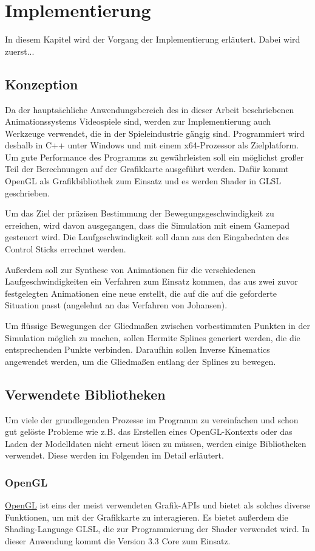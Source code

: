 \chapter{Implementierung}
In diesem Kapitel wird der Vorgang der Implementierung erläutert. Dabei wird zuerst...


\section{Konzeption}
Da der hauptsächliche Anwendungsbereich des in dieser Arbeit beschriebenen Animationssystems Videospiele sind, werden zur Implementierung auch Werkzeuge verwendet, die in der Spieleindustrie gängig sind. Programmiert wird deshalb in C++ unter Windows und mit einem x64-Prozessor als Zielplatform. Um gute Performance des Programms zu gewährleisten soll ein möglichst großer Teil der Berechnungen auf der Grafikkarte ausgeführt werden. Dafür kommt OpenGL als Grafikbibliothek zum Einsatz und es werden Shader in GLSL geschrieben.

Um das Ziel der präzisen Bestimmung der Bewegungsgeschwindigkeit zu erreichen, wird davon ausgegangen, dass die Simulation mit einem Gamepad gesteuert wird. Die Laufgeschwindigkeit soll dann aus den Eingabedaten des Control Sticks errechnet werden.

Außerdem soll zur Synthese von Animationen für die verschiedenen Laufgeschwindigkeiten ein Verfahren zum Einsatz kommen, das aus zwei zuvor festgelegten Animationen eine neue erstellt, die auf die auf die geforderte Situation passt (angelehnt an das Verfahren von Johansen\cite{johansen2009automated}).

Um flüssige Bewegungen der Gliedmaßen zwischen vorbestimmten Punkten in der Simulation möglich zu machen, sollen Hermite Splines generiert werden, die die entsprechenden Punkte verbinden. Daraufhin sollen Inverse Kinematics angewendet werden, um die Gliedmaßen entlang der Splines zu bewegen.

\section{Verwendete Bibliotheken}
Um viele der grundlegenden Prozesse im Programm zu vereinfachen und schon gut gelöste Probleme wie z.B. das Erstellen eines OpenGL-Kontexts oder das Laden der Modelldaten nicht erneut lösen zu müssen, werden einige Bibliotheken verwendet. Diese werden im Folgenden im Detail erläutert.

\subsection{OpenGL}
\href{https://www.opengl.org/}{OpenGL} ist eins der meist verwendeten Grafik-APIs und bietet als solches diverse Funktionen, um mit der Grafikkarte zu interagieren. Es bietet außerdem die Shading-Language GLSL, die zur Programmierung der Shader verwendet wird. In dieser Anwendung kommt die Version 3.3 Core zum Einsatz.


